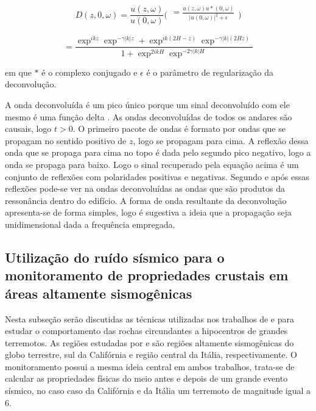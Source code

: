 \documentclass[paper,twocolumn]{geophysics}
\begin{document}
\begin{equation}
D(z,0,\omega) = \frac{u(z,\omega)}{u(0,\omega)}  \bigl(\begin{smallmatrix}
 = \frac{u(z,\omega)u \ast (0,\omega)}{|u(0,\omega)|^2 + \epsilon}  \\ 
 \end{smallmatrix}\bigr)
\end{equation}

\begin{equation}
 = \frac{\exp^{ikz} \exp^{-\gamma |k|z} + \exp^{ik(2H-z)} \exp^{-\gamma |k| (2Hz)}} {1 + \exp^{2ikH} \exp^{-2\gamma |k| H}} 
\end{equation}

em que $\ast$ é o complexo conjugado e $\epsilon$ é o parâmetro de regularização da deconvolução.

A onda deconvoluída é um pico único porque um sinal deconvoluído com ele mesmo é uma função delta \citep{snieder_extracting_2006}. As ondas deconvoluídas de todos os andares são causais, logo $t>0$. O primeiro pacote de ondas é formato por ondas que se propagam no sentido positivo de $z$, logo se propagam para cima. A reflexão dessa onda que se propaga para cima no topo é dada pelo segundo pico negativo, logo a onda se propaga para baixo. Logo o sinal recuperado pela equação acima é um conjunto de reflexões com polaridades positivas e negativas. Segundo \cite{snieder_extracting_2006} e \cite{nakata_damage_2015} após essas reflexões pode-se ver na ondas deconvoluídas as ondas que são produtos da ressonância dentro do edifício. A forma de onda resultante da deconvolução apresenta-se de forma simples, logo é sugestiva a ideia que a propagação seja unidimensional dada a frequência empregada. 

\subsection*{Utilização do ruído sísmico para o monitoramento de propriedades crustais em áreas altamente sismogênicas}

Nesta subseção serão discutidas as técnicas utilizadas nos trabalhos de \cite{li_seismic_2006} e \cite{zaccarelli_variations_2011} para estudar o comportamento das rochas circundantes a hipocentros de grandes terremotos. As regiões estudadas por \cite{li_seismic_2006} e \cite{zaccarelli_variations_2011} são regiões altamente sismogênicas do globo terrestre, sul da Califórnia e região central da Itália, respectivamente. O monitoramento possui a mesma ideia central em ambos trabalhos, trata-se de calcular as propriedades físicas do meio antes e depois de um grande evento sísmico, no caso caso da Califórnia e da Itália um terremoto de magnitude igual a 6. 
\end{document}
